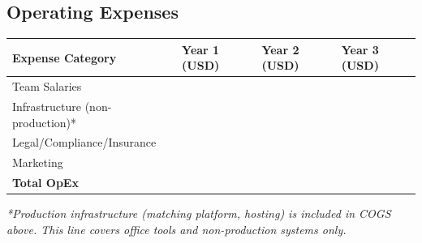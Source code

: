 \subsection{Operating Expenses}
\begin{table}[H]
\centering
\begin{tabularx}{\linewidth}{l Y Y Y}
\toprule
Expense Category & Year 1 (USD) & Year 2 (USD) & Year 3 (USD) \\\midrule
Team Salaries & \numint{\teamSalariesYearOne} & \numint{\teamSalariesYearTwo} & \numint{\teamSalariesYearThree} \\
Infrastructure (non-production)* & \numint{\infrastructureYearOne} & \numint{\infrastructureYearTwo} & \numint{\infrastructureYearThree} \\
Legal/Compliance/Insurance & \numint{\legalComplianceYearOne} & \numint{\legalComplianceYearTwo} & \numint{\legalComplianceYearThree} \\
Marketing & \numint{\marketingBudgetYearOne} & \numint{\marketingBudgetYearTwo} & \numint{\marketingBudgetYearThree} \\\midrule
\textbf{Total OpEx} & \textbf{\numint{\totalOperatingCostsYearOne}} & \textbf{\numint{\totalOperatingCostsYearTwo}} & \textbf{\numint{\totalOperatingCostsYearThree}} \\
\bottomrule
\end{tabularx}
\end{table}
\textit{*Production infrastructure (matching platform, hosting) is included in COGS above. This line covers office tools and non-production systems only.}

